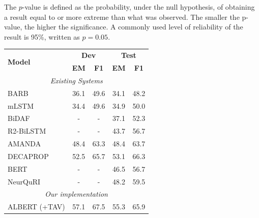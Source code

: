 \documentclass[letterpaper]{article} %
\begin{document}
The $p$-value is defined as the probability, under the null hypothesis, of obtaining a result equal to or more extreme than what was observed. The smaller the p-value, the higher the significance. A commonly used level of reliability of the result is 95\%, written as $p=0.05$.


\begin{table}
	\centering
	\setlength{\tabcolsep}{4.2pt}
	{
		\begin{tabular}{l c c c c }
			\toprule
			\multirow{2}{*}{\textbf{Model} }& \multicolumn{2}{c}{\textbf{Dev}} & \multicolumn{2}{c}{\textbf{Test}}\\
			& \textbf{EM} & \textbf{F1}&   \textbf{EM} & \textbf{F1}\\
			\midrule
			\multicolumn{5}{c}{\emph{Existing Systems}} \\
			BARB \cite{trischler2017newsqa} &36.1  & 49.6 & 34.1 & 48.2  \\
			mLSTM \cite{DBLP:conf/iclr/Wang017a} & 34.4 & 49.6 & 34.9 & 50.0 \\
			BiDAF \cite{Seo2016Bidirectional} & - & - & 37.1 & 52.3  \\
			R2-BiLSTM \cite{DBLP:journals/corr/Weissenborn17} & - & - & 43.7 & 56.7  \\
			AMANDA \cite{DBLP:conf/aaai/KunduN18} & 48.4& 63.3 &48.4 &63.7  \\
			DECAPROP \cite{tay2018densely} & 52.5 &65.7 &53.1 &66.3 \\
			BERT \cite{devlin2018bert} & - & - & 46.5 & 56.7 \\
			NeurQuRI \cite{back2020neurquri} & - & - & 48.2 & 59.5 \\
			\midrule
			\multicolumn{5}{c}{\emph{Our implementation}} \\
			ALBERT (+TAV) & 57.1 & 67.5 & 55.3 & 65.9\\

\end{tabular}}
\end{table}
\end{document}
